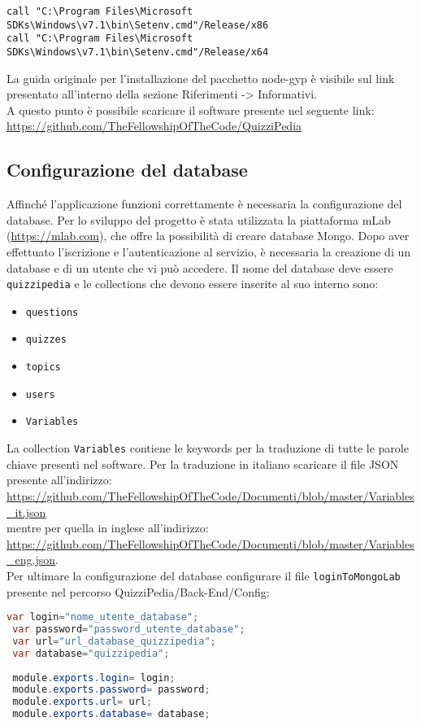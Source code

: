 	\begin{center}
		\verb|call "C:\Program Files\Microsoft SDKs\Windows\v7.1\bin\Setenv.cmd"/Release/x86|\\
		\verb|call "C:\Program Files\Microsoft SDKs\Windows\v7.1\bin\Setenv.cmd"/Release/x64|\\
	\end{center}
La guida originale per l'installazione del pacchetto node-gyp è visibile sul link presentato all'interno della sezione Riferimenti -> Informativi.\\
A questo punto è possibile scaricare il software presente nel seguente link:\\ 
\url{https://github.com/TheFellowshipOfTheCode/QuizziPedia}

\subsection{Configurazione del database}
Affinché l'applicazione funzioni correttamente è necessaria la configurazione del database. Per lo sviluppo del progetto è stata utilizzata la piattaforma mLab (\url{https://mlab.com}), che offre la possibilità di creare database Mongo. Dopo aver effettuato l'iscrizione e l'autenticazione al servizio, è necessaria la creazione di un database e di un utente che vi può accedere. Il nome del database deve essere \texttt{quizzipedia} e le collections che devono essere inserite al suo interno sono:
\begin{itemize}
	\item \texttt{questions}
	\item \texttt{quizzes}
	\item \texttt{topics}
	\item \texttt{users}
	\item \texttt{Variables}
\end{itemize}
 La collection \texttt{Variables} contiene le keywords per la traduzione di tutte le parole chiave presenti nel software. Per la traduzione in italiano scaricare il file JSON presente all'indirizzo:\\ 
 \url{https://github.com/TheFellowshipOfTheCode/Documenti/blob/master/Variables_it.json}\\
 mentre per quella in inglese all'indirizzo:\\ 
 \url{https://github.com/TheFellowshipOfTheCode/Documenti/blob/master/Variables_eng.json}.\\ 
 Per ultimare la configurazione del database configurare il file \texttt{loginToMongoLab} presente nel percorso QuizziPedia/Back-End/Config:
 \begin{lstlisting}[language=Java,firstnumber=1]
 var login="nome_utente_database";
 var password="password_utente_database";
 var url="url_database_quizzipedia";
 var database="quizzipedia";
 
 module.exports.login= login;
 module.exports.password= password;
 module.exports.url= url;
 module.exports.database= database;
 
 \end{lstlisting}
 
